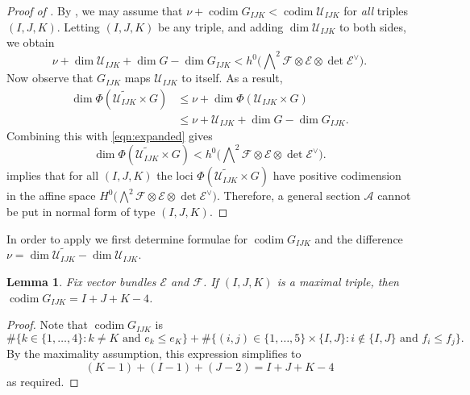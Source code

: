 \documentclass[11pt]{amsart}
\numberwithin{theorem}{section}
\numberwithin{equation}{section}
\newtheorem{lemma}[theorem]{Lemma}
\theoremstyle{definition}\newtheorem{defn}[theorem]{Definition}
\theoremstyle{definition}\newtheorem{remark}[theorem]{Remark}
\theoremstyle{definition}\newtheorem{question}[theorem]{Question}
\theoremstyle{definition}\newtheorem{problem}[theorem]{Problem}
\newcommand{\cE}{\mathcal{E}}
\newcommand{\cF}{\mathcal{F}}
\newcommand{\cA}{\mathcal{A}}
\DeclareMathOperator{\codim}{codim}
\newcommand{\marksing}{\mathcal{U}}
\newcommand{\I}{I}
\newcommand{\J}{J}
\newcommand{\K}{K}
\begin{document}
\begin{proof}[Proof of ]
By , we may assume that $\nu + \codim G_{\I\J\K} < \codim \marksing_{\I\J\K}$ for \emph{all} triples $(\I,\J,\K)$. Letting $(\I,\J,\K)$ be any triple, and adding $\dim \marksing_{\I\J\K}$ to both sides, we obtain
\begin{equation}
\label{eqn:expanded}
\nu + \dim \marksing_{\I\J\K} + \dim G - \dim G_{\I\J\K} < h^0\Big(\bigwedge\nolimits^2 \cF \otimes \cE \otimes \det \cE^\vee \Big).
\end{equation}
Now observe that $G_{\I\J\K}$ maps $\marksing_{\I\J\K}$ to itself. As a result,
\begin{align*}
\dim \Phi(\widetilde{\marksing_{\I\J\K}} \times G) &\leq \nu + \dim \Phi({\marksing_{\I\J\K}} \times G) \\
\label{eqn:dim-bound}
&\leq \nu + \marksing_{\I\J\K} + \dim G - \dim G_{\I\J\K}.
\end{align*}
Combining this with \eqref{eqn:expanded} gives
\begin{equation}
\label{eqn:final-bound}
\dim \Phi(\widetilde{\marksing_{\I\J\K}} \times G) < h^0\Big(\bigwedge\nolimits^2 \cF \otimes \cE \otimes \det \cE^\vee \Big).
\end{equation}
 implies that for all $(\I,\J,\K)$ the loci $\Phi(\widetilde{\marksing_{\I\J\K}} \times G)$ have positive codimension in the affine space $H^0\Big(\bigwedge\nolimits^2 \cF \otimes \cE \otimes \det \cE^\vee \Big)$. Therefore, a general section $\cA$ cannot be put in normal form of type $(\I,\J,\K)$.
\end{proof}

In order to apply  we first determine formulae for $\codim G_{\I\J\K}$ and the difference $\nu = \dim \widetilde{\marksing_{\I\J\K}} - \dim \marksing_{\I\J\K}$.


\begin{lemma}
\label{prop:gijk-dim}
Fix vector bundles $\cE$ and $\cF$. If $(\I,\J,\K)$ is a maximal triple, then $\codim G_{\I\J\K} = \I + \J + \K - 4$.
\end{lemma}
\begin{proof}
Note that $\codim G_{\I\J\K}$ is
\[
    \#\{k \in \{1,\dots, 4\} : k \neq \K \text{ and } e_{k} \leq e_K\} + \#\{(i,j) \in \{1,\dots,5\} \times \{\I,\J\} : i \not\in \{\I,\J\} \text{ and } f_{i} \leq f_j\}.
\]
By the maximality assumption, this expression simplifies to 
\[
 (\K-1) + (\I-1) + (\J-2) = \I + \J + \K - 4
\]
as required.
\end{proof}
\end{document}
